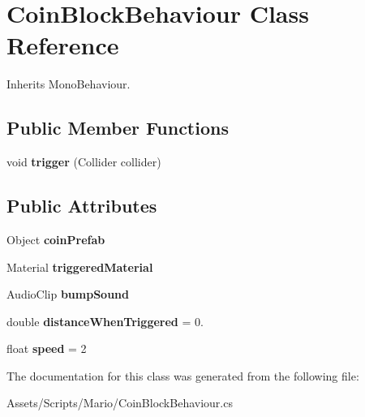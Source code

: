 \hypertarget{class_coin_block_behaviour}{\section{Coin\-Block\-Behaviour Class Reference}
\label{class_coin_block_behaviour}
}


Inherits Mono\-Behaviour.

\subsection*{Public Member Functions}
\begin{DoxyCompactItemize}
\item 
\hypertarget{class_coin_block_behaviour_a88ed78184c9a985fd5dbecaf42750c8a}{void {\bfseries trigger} (Collider collider)}\label{class_coin_block_behaviour_a88ed78184c9a985fd5dbecaf42750c8a}

\end{DoxyCompactItemize}
\subsection*{Public Attributes}
\begin{DoxyCompactItemize}
\item 
\hypertarget{class_coin_block_behaviour_abd85c2a4210c41905a32d6553304a14d}{Object {\bfseries coin\-Prefab}}\label{class_coin_block_behaviour_abd85c2a4210c41905a32d6553304a14d}

\item 
\hypertarget{class_coin_block_behaviour_a65317301cfb3300c1df59917f6af0386}{Material {\bfseries triggered\-Material}}\label{class_coin_block_behaviour_a65317301cfb3300c1df59917f6af0386}

\item 
\hypertarget{class_coin_block_behaviour_ad887d383e0757e37f667a77e2c832d94}{Audio\-Clip {\bfseries bump\-Sound}}\label{class_coin_block_behaviour_ad887d383e0757e37f667a77e2c832d94}

\item 
\hypertarget{class_coin_block_behaviour_aaceeb81fb8815fdb92a681f81aa34dcc}{double {\bfseries distance\-When\-Triggered} = 0.}\label{class_coin_block_behaviour_aaceeb81fb8815fdb92a681f81aa34dcc}

\item 
\hypertarget{class_coin_block_behaviour_afd2a13c896ca661f24a823f80d75be28}{float {\bfseries speed} = 2}\label{class_coin_block_behaviour_afd2a13c896ca661f24a823f80d75be28}

\end{DoxyCompactItemize}


The documentation for this class was generated from the following file\-:\begin{DoxyCompactItemize}
\item 
Assets/\-Scripts/\-Mario/Coin\-Block\-Behaviour.\-cs\end{DoxyCompactItemize}
